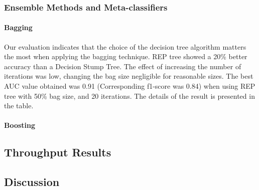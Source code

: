 \subsubsection{Ensemble Methods and Meta-classifiers}

\paragraph{Bagging}

Our evaluation indicates that the choice of the decision tree algorithm matters the most when applying the bagging technique. REP tree showed a 20\% better accuracy than a Decision Stump Tree. The effect of increasing the number of iterations was low, changing the bag size negligible for reasonable sizes. The best AUC value obtained was 0.91 (Corresponding f1-score was 0.84) when using REP tree with 50\% bag size, and 20 iterations. The details of the result is presented in the table.

\paragraph{Boosting}


\subsection{Throughput Results}



\subsection{Discussion}

